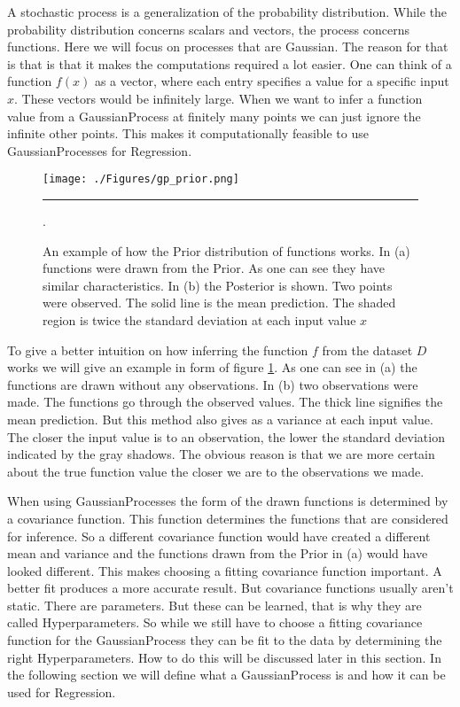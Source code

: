 A stochastic process is a generalization of the probability distribution. While the probability distribution concerns scalars and vectors, the process concerns functions\citep[p. 2]{Rasmussen:2005:GPM:1162254}. Here we will focus on processes that are Gaussian. The reason for that is that is that it makes the computations required a lot easier. 
One can think of a function $f(x)$ as a vector, where each entry specifies a value for a specific input $x$. These vectors would be infinitely large. When we want to infer a function value from a \Gls{GaussianProcess} at finitely many points we can just ignore the infinite other points. This makes it computationally feasible to use \Gls{GaussianProcess}es for \gls{Regression}\citep[p. 2]{Rasmussen:2005:GPM:1162254}. 
\begin{figure}[htbp]
	\centering
		\texttt{[image: ./Figures/gp\_prior.png]}
		\rule{35em}{0.5pt}
	\caption[\gls{Prior}]{An example of how the \gls{Prior} distribution of functions works. In (a) functions were drawn from the \gls{Prior}. As one can see they have similar characteristics. In (b) the \gls{Posterior} is shown. Two points were observed. The solid line is the mean prediction. The shaded region is twice the standard deviation at each input value $x$\citep[p. 3]{Rasmussen:2005:GPM:1162254}}.
	\label{fig:gp_prior}
\end{figure}

To give a better intuition on how inferring the function $f$ from the dataset $D$ works we will give an example in form of figure \ref{fig:gp_prior}. As one can see in (a) the functions are drawn without any observations. In (b) two observations were made. The functions go through the observed values. The thick line signifies the mean prediction. But this method also gives as a variance at each input value. The closer the input value is to an observation, the lower the standard deviation indicated by the gray shadows. The obvious reason is that we are more certain about the true function value the closer we are to the observations we made.

When using \Gls{GaussianProcess}es the form of the drawn functions is determined by a covariance function\citep[p. 4]{Rasmussen:2005:GPM:1162254}. This function determines the functions that are considered for inference. So a different covariance function would have created a different mean and variance and the functions drawn from the \gls{Prior} in (a) would have looked different. This makes choosing a fitting covariance function important. A better fit produces a more accurate result. But covariance functions usually aren't static. There are parameters. But these can be learned, that is why they are called \gls{Hyperparameter}s. So while we still have to choose a fitting covariance function for the \Gls{GaussianProcess} they can be fit to the data by determining the right \gls{Hyperparameter}s. How to do this will be discussed later in this section. In the following section we will define what a \Gls{GaussianProcess} is and how it can be used for \gls{Regression}. 

